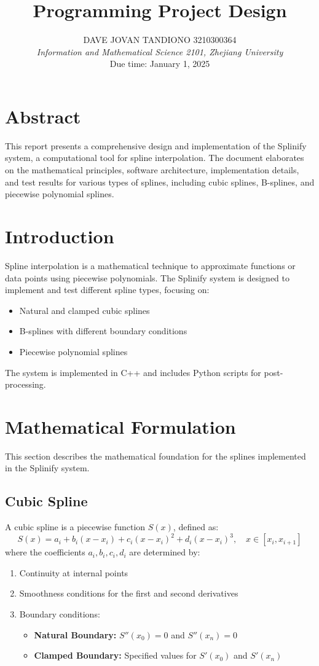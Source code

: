 \documentclass[10pt,a4paper]{article}
\title{\textbf{Programming Project Design}}
\author{DAVE JOVAN TANDIONO 3210300364 \\ 
\textit{Information and Mathematical Science 2101, Zhejiang University} \\ 
Due time: January 1, 2025}
\date{}
\begin{document}
\maketitle

\section*{Abstract}
This report presents a comprehensive design and implementation of the Splinify system, a computational tool for spline interpolation. The document elaborates on the mathematical principles, software architecture, implementation details, and test results for various types of splines, including cubic splines, B-splines, and piecewise polynomial splines.

\tableofcontents

\section{Introduction}
Spline interpolation is a mathematical technique to approximate functions or data points using piecewise polynomials. The Splinify system is designed to implement and test different spline types, focusing on:
\begin{itemize}
    \item Natural and clamped cubic splines
    \item B-splines with different boundary conditions
    \item Piecewise polynomial splines
\end{itemize}

The system is implemented in C++ and includes Python scripts for post-processing.

\section{Mathematical Formulation}
This section describes the mathematical foundation for the splines implemented in the Splinify system.

\subsection{Cubic Spline}
A cubic spline is a piecewise function $S(x)$, defined as:
\[
S(x) = a_i + b_i(x - x_i) + c_i(x - x_i)^2 + d_i(x - x_i)^3, \quad x \in [x_i, x_{i+1}]
\]
where the coefficients $a_i, b_i, c_i, d_i$ are determined by:
\begin{enumerate}
    \item Continuity at internal points
    \item Smoothness conditions for the first and second derivatives
    \item Boundary conditions:
    \begin{itemize}
        \item \textbf{Natural Boundary:} $S''(x_0) = 0$ and $S''(x_n) = 0$
        \item \textbf{Clamped Boundary:} Specified values for $S'(x_0)$ and $S'(x_n)$
    \end{itemize}
\end{enumerate}
\end{document}
